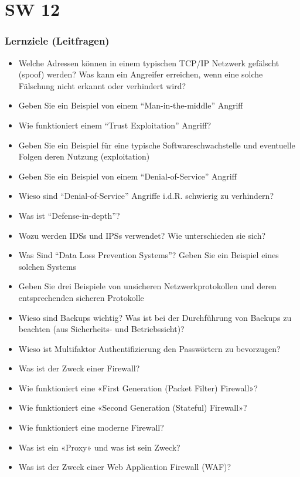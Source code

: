 \part{SW 12}
\section{Lernziele (Leitfragen)}
\begin{itemize}
    \item Welche Adressen können in einem typischen TCP/IP Netzwerk gefälscht (spoof) werden? Was kann ein Angreifer erreichen, wenn eine solche Fälschung nicht erkannt oder verhindert wird?
    \item Geben Sie ein Beispiel von einem "`Man-in-the-middle"' Angriff
    \item Wie funktioniert einem "`Trust Exploitation"' Angriff?
    \item Geben Sie ein Beispiel für eine typische Softwareschwachstelle und eventuelle Folgen deren Nutzung (exploitation)
    \item Geben Sie ein Beispiel von einem "`Denial-of-Service"' Angriff
    \item Wieso sind "`Denial-of-Service"' Angriffe i.d.R. schwierig zu verhindern?
    \item Was ist "`Defense-in-depth"'?
    \item Wozu werden IDSs und IPSs verwendet? Wie unterschieden sie sich?
    \item Was Sind "`Data Loss Prevention Systems"'? Geben Sie ein Beispiel eines solchen Systems
    \item Geben Sie drei Beispiele von unsicheren Netzwerkprotokollen und deren entsprechenden sicheren Protokolle
    \item Wieso sind Backups wichtig? Was ist bei der Durchführung von Backups zu beachten (aus Sicherheits- und Betriebssicht)?
    \item Wieso ist Multifaktor Authentifizierung den Passwörtern zu bevorzugen?
    \item Was ist der Zweck einer Firewall?
    \item Wie funktioniert eine «First Generation (Packet Filter) Firewall»?
    \item Wie funktioniert eine «Second Generation (Stateful) Firewall»?
    \item Wie funktioniert eine moderne Firewall?
    \item Was ist ein «Proxy» und was ist sein Zweck?
    \item Was ist der Zweck einer Web Application Firewall (WAF)?
\end{itemize}

